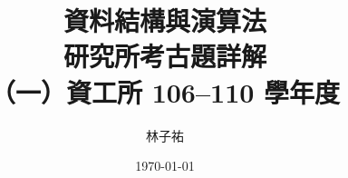 \documentclass[12pt]{report}
\title{資料結構與演算法\\研究所考古題詳解\\[0.3em]{\LARGE （一）資工所 106--110 學年度}}
\author{林子祐}
\date{\today}
\renewcommand{\chaptermark}[1]{\markboth{第~\thechapter~章\quad #1}{}}
\begin{document}
\maketitle
\romantableofcontents




\appendix
{}
\renewcommand{\chaptermark}[1]{\markboth{附錄~\thechapter\quad #1}{}}


\end{document}

